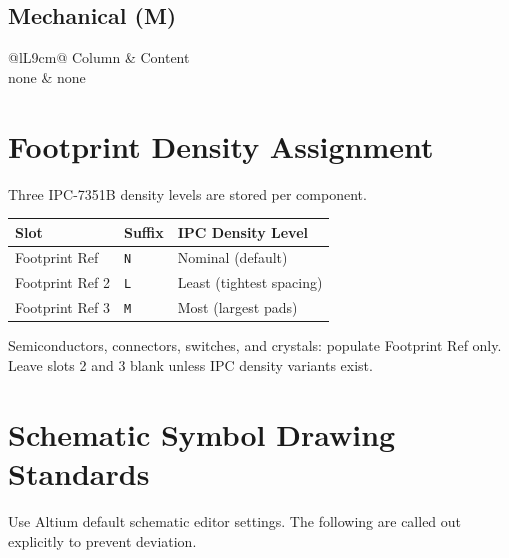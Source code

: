 \documentclass[11pt,a4paper]{article}
\begin{document}
\subsection{Mechanical (M)}

\begin{tabular}{@{}lL{9cm}@{}}
\toprule
Column & Content \\
\midrule
none & none \\
\bottomrule
\end{tabular}

\section{Footprint Density Assignment}

Three IPC-7351B density levels are stored per component.

\begin{tabular}{@{}lll@{}}
\toprule
Slot & Suffix & IPC Density Level \\
\midrule
Footprint Ref   & \texttt{N} & Nominal (default) \\
Footprint Ref 2 & \texttt{L} & Least (tightest spacing) \\
Footprint Ref 3 & \texttt{M} & Most (largest pads) \\
\bottomrule
\end{tabular}

Semiconductors, connectors, switches, and crystals: populate Footprint Ref only. Leave slots 2 and 3 blank unless IPC density variants exist.

\section{Schematic Symbol Drawing Standards}

Use Altium default schematic editor settings. The following are called out explicitly to prevent deviation.
\end{document}
